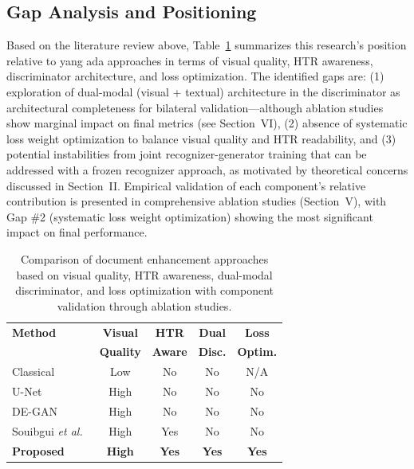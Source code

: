 \documentclass[journal]{IEEEtran}
\begin{document}
\subsection{Gap Analysis and Positioning}

Based on the literature review above, Table~\ref{table_comparison} summarizes this research's position relative to yang ada approaches in terms of visual quality, HTR awareness, discriminator architecture, and loss optimization. The identified gaps are: (1) exploration of dual-modal (visual + textual) architecture in the discriminator as architectural completeness for bilateral validation—although ablation studies show marginal impact on final metrics (see Section~VI), (2) absence of systematic loss weight optimization to balance visual quality and HTR readability, and (3) potential instabilities from joint recognizer-generator training that can be addressed with a frozen recognizer approach, as motivated by theoretical concerns discussed in Section~II. Empirical validation of each component's relative contribution is presented in comprehensive ablation studies (Section~V), with Gap \#2 (systematic loss weight optimization) showing the most significant impact on final performance.

\begin{table}[!t]
\renewcommand{\arraystretch}{1.3}
\caption{Comparison of document enhancement approaches based on visual quality, HTR awareness, dual-modal discriminator, and loss optimization with component validation through ablation studies.}
\label{table_comparison}
\centering
\begin{tabular}{|l|c|c|c|c|}
\hline
\textbf{Method} & \textbf{Visual} & \textbf{HTR} & \textbf{Dual} & \textbf{Loss} \\
 & \textbf{Quality} & \textbf{Aware} & \textbf{Disc.} & \textbf{Optim.} \\
\hline
Classical~\cite{otsu1979threshold,sauvola2000adaptive} & Low & No & No & N/A \\
U-Net~\cite{ronneberger2015unet} & High & No & No & No \\
DE-GAN~\cite{souibgui2020degan} & High & No & No & No \\
Souibgui \textit{et al.}~\cite{souibgui2021enhance} & High & Yes & No & No \\
\textbf{Proposed} & \textbf{High} & \textbf{Yes} & \textbf{Yes} & \textbf{Yes} \\
\hline
\end{tabular}
\end{table}
\end{document}
